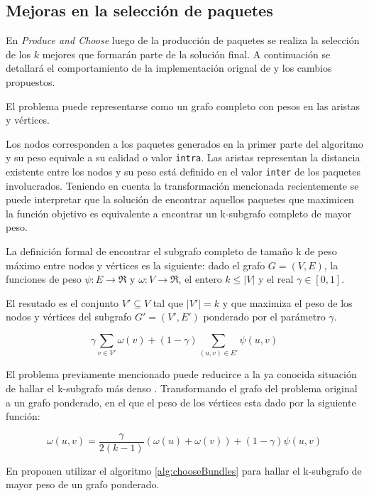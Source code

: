\subsection{Mejoras en la selección de paquetes}
En \emph{Produce and Choose} luego de la producción de paquetes se realiza la selección de los $k$ mejores que formarán parte de la solución final. A continuación se detallará el comportamiento de la implementación orignal de \cite{journals/tkde/Amer-YahiaBCFMZ14} y los cambios propuestos.

El problema puede representarse como un grafo completo con pesos en las aristas y vértices. 

Los nodos corresponden a los paquetes generados en la primer parte del algoritmo y su peso equivale a su calidad o valor \texttt{intra}. Las aristas representan la distancia existente entre los nodos y su peso está definido en el valor \texttt{inter} de los paquetes involucrados. Teniendo en cuenta la transformación mencionada recientemente se puede interpretar que la solución de encontrar aquellos paquetes que maximicen la función objetivo es equivalente a encontrar un k-subgrafo completo de mayor peso.

La definición formal de encontrar el subgrafo completo de tamaño k de peso máximo entre nodos y vértices es la siguiente: dado el grafo $ G = (V,E) $, la funciones de peso $\psi : E \rightarrow \Re$ y $\omega : V \rightarrow \Re$, el entero $ k \leq |V| $ y el real $\gamma \in [0,1]$. 

El resutado es el conjunto $V' \subseteq V$ tal que $|V'| = k$ y que maximiza el peso de los nodos y vértices del subgrafo $G' = (V', E')$ ponderado por el parámetro $\gamma$.

\begin{equation}
\gamma \sum_{v \in V'}{\omega(v)} + (1 - \gamma) \sum_{(u,v) \in E'}{\psi(u,v)}
\end{equation}

El problema previamente mencionado puede reducirce a la ya conocida situación de hallar el k-subgrafo más denso \cite{DBLP:journals/algorithmica/FeigePK01}. Transformando el grafo del problema original a un grafo ponderado, en el que el peso de los vértices esta dado por la siguiente función:
 
\begin{equation}
\omega(u,v) = \dfrac{\gamma}{2( k - 1)} (\omega(u) + \omega(v)) + (1 - \gamma)\psi(u,v) 
\end{equation}

En \cite{journals/tkde/Amer-YahiaBCFMZ14} proponen utilizar el algoritmo \ref{alg:chooseBundles} para hallar el k-subgrafo de mayor peso de un grafo ponderado. 

